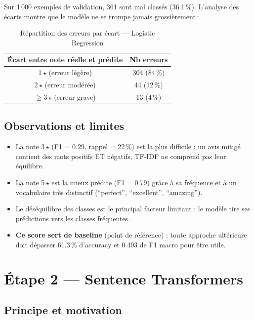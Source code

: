 \documentclass[12pt, a4paper]{article}
\begin{document}
Sur 1\,000 exemples de validation, 361 sont mal classés (36.1\,\%).
L'analyse des écarts montre que le modèle ne se trompe jamais grossièrement :

\begin{table}[H]
  \centering
  \begin{tabular}{cc}
    \toprule
    \textbf{Écart entre note réelle et prédite} & \textbf{Nb erreurs} \\
    \midrule
    1\,$\star$ (erreur légère) & 304 (84\,\%) \\
    2\,$\star$ (erreur modérée) & 44 (12\,\%) \\
    $\geq$3\,$\star$ (erreur grave) & 13 (4\,\%) \\
    \bottomrule
  \end{tabular}
  \caption{Répartition des erreurs par écart — Logistic Regression}
\end{table}

\subsection{Observations et limites}

\begin{itemize}
  \item La note 3\,$\star$ (F1 = 0.29, rappel = 22\,\%) est la plus difficile : un avis
        mitigé contient des mots positifs ET négatifs, TF-IDF ne comprend pas leur équilibre.
  \item La note 5\,$\star$ est la mieux prédite (F1 = 0.79) grâce à sa fréquence et
        à un vocabulaire très distinctif (``perfect'', ``excellent'', ``amazing'').
  \item Le déséquilibre des classes est le principal facteur limitant :
        le modèle tire ses prédictions vers les classes fréquentes.
  \item \textbf{Ce score sert de baseline} (point de référence) : toute approche
        ultérieure doit dépasser 61.3\,\% d'accuracy et 0.493 de F1 macro pour être utile.
\end{itemize}

\section{Étape 2 — Sentence Transformers}
\label{sec:sentencetransformers}

\subsection{Principe et motivation}
\end{document}
